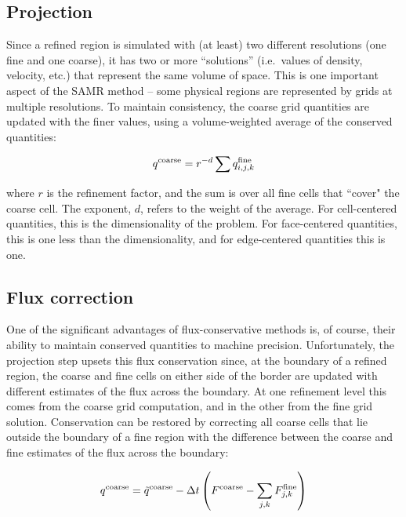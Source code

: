 \subsection{Projection}
\label{sec:projection}

Since a refined region is simulated with (at least) two different
resolutions (one fine and one coarse), it has two or more
``solutions'' (i.e.~values of density, velocity, etc.) that represent
the same volume of space.  This is one important aspect of the SAMR
method -- some physical regions are represented by grids at multiple
resolutions.  To maintain consistency, the coarse grid quantities are
updated with the finer values, using a volume-weighted average of the
conserved quantities:

\begin{equation}
q^{\rm coarse} = r^{-d} \sum q^{\rm fine}_{i, j,k}
\end{equation}

where $r$ is the refinement factor, and the sum is over all fine cells
that ``cover" the coarse cell. The exponent, $d$, refers to the weight
of the average.  For cell-centered quantities, this is the
dimensionality of the problem.  For face-centered quantities, this is
one less than the dimensionality, and for edge-centered quantities
this is one.

\subsection{Flux correction}
\label{sec:flux_correction}

One of the significant advantages of flux-conservative methods is, of
course, their ability to maintain conserved quantities to machine
precision.  Unfortunately, the projection step upsets this flux
conservation since, at the boundary of a refined region, the coarse
and fine cells on either side of the border are updated with different
estimates of the flux across the boundary.  At one refinement level
this comes from the coarse grid computation, and in the other from the
fine grid solution.  Conservation can be restored by correcting all
coarse cells that lie outside the boundary of a fine region with the
difference between the coarse and fine estimates of the flux across
the boundary:

\begin{equation}
  q^{\rm coarse} = \tilde{q}^{\rm coarse} - \Delta t \left( F^{\rm
      coarse} - \sum_{j,k} F^{\rm fine}_{j,k} \right)
\end{equation}

